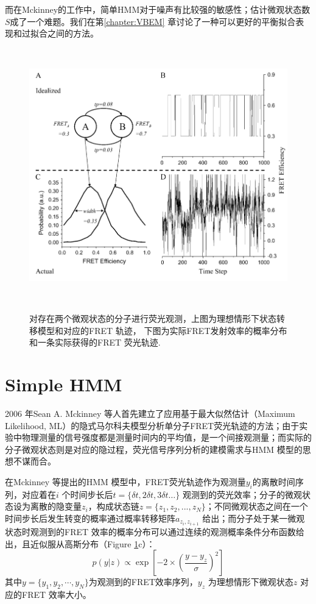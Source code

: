 \documentclass[11pt, a4paper]{article}
\begin{document}
而在Mckinney的工作中，简单HMM对于噪声有比较强的敏感性；估计微观状态数$S$成了一个难题。我们在第\ref{chapter:VBEM} 章讨论了一种可以更好的平衡拟合表现和过拟合之间的方法。
\begin{figure}[htb]
  \centering
  \includegraphics[height=11cm]{Fig_trace.PNG}\\
  \caption{对存在两个微观状态的分子进行荧光观测，上图为理想情形下状态转移模型和对应的FRET 轨迹， 下图为实际FRET发射效率的概率分布和一条实际获得的FRET 荧光轨迹.}
  \label{fig:trace}
\end{figure}

\section{Simple HMM}\label{chapter:HMM}

2006 年Sean A. Mckinney 等人首先建立了应用基于最大似然估计（Maximum Likelihood, ML）的隐式马尔科夫模型分析单分子FRET荧光轨迹的方法\cite{HMM}；由于实验中物理测量的信号强度都是测量时间内的平均值，是一个间接观测量；而实际的分子微观状态则是对应的隐过程，荧光信号序列分析的建模需求与HMM 模型的思想不谋而合。

在Mckinney 等提出的HMM 模型中，FRET荧光轨迹作为观测量$y_i$的离散时间序列，对应着在$i$ 个时间步长后$t=\{\delta t,2\delta t,3\delta t…\}$ 观测到的荧光效率；分子的微观状态设为离散的隐变量$z_i$，构成状态链$z=\{z_1,z_2,...,z_N\}$；不同微观状态之间在一个时间步长后发生转变的概率通过概率转移矩阵$a_{z_{i}, z_{i+1}}$ 给出；而分子处于某一微观状态时观测到的FRET 效率的概率分布可以通过连续的观测概率条件分布函数给出，且近似服从高斯分布（Figure \ref{fig:trace}c）：
\begin{equation}
p(y|z) \propto \exp\left[-2\times\left(\frac{y- y_z}{\sigma}\right)^2\right]
\end{equation}
其中$y=\{y_1, y_2,\cdots, y_N\}$为观测到的FRET效率序列，$y_{z}$ 为理想情形下微观状态$z$ 对应的FRET 效率大小。
\end{document}
